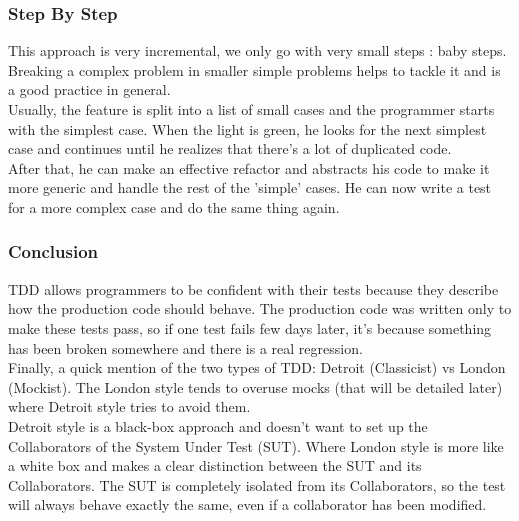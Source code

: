 \subsubsection{Step By Step}
This approach is very incremental, we only go with very small steps :
baby steps.
Breaking a complex problem in smaller simple problems helps to tackle it
and is a good practice in general. \\
Usually, the feature is split into a list of small cases and the
programmer starts with the simplest case.
When the light is green, he looks for the next simplest case and
continues until he realizes that there's a lot of duplicated code. \\
After that, he can make an effective refactor and abstracts his code to
make it more generic and handle the rest of the 'simple' cases.
He can now write a test for a more complex case and do the same thing
again.
\subsubsection{Conclusion}
TDD allows programmers to be confident with their tests because they
describe how the production code should behave.
The production code was written only to make these tests pass, so if
one test fails few days later, it's because something has been broken
somewhere and there is a real regression. \\
\newline
Finally, a quick mention of the two types of TDD: Detroit (Classicist)
vs London (Mockist).
The London style tends to overuse mocks (that will be detailed later)
where Detroit style tries to avoid them. \\
Detroit style is a black-box approach and doesn't want to set up the
Collaborators of the System Under Test (SUT).
Where London style is more like a white box and makes a clear distinction
between the SUT and its Collaborators.
The SUT is completely isolated from its Collaborators, so the test will
always behave exactly the same, even if a collaborator has been modified.

